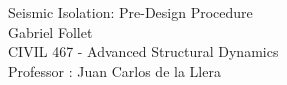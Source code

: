 
\newpage
\pagestyle{fancy}
\fancyhf{}
\setcounter{page}{1} 
\fancyfoot[R]{\thepage}

\maketitle
\newpage
\begin{center}
\Large{Seismic Isolation: Pre-Design Procedure}\\
\vspace{0.3cm}
\large{Gabriel Follet}\\
\vspace{0.5cm}
\large {CIVIL 467 - Advanced Structural Dynamics \\
\vspace{0.2cm}
    Professor : Juan Carlos de la Llera}\\
\end{center}
